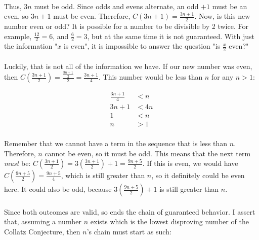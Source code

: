 \documentclass[12pt,letterpaper]{article}
\begin{document}
			\paragraph{} Thus, $3n$ must be odd. Since odds and evens alternate, an odd $+ 1$ must be an even, so $3n + 1$ must be even. Therefore, $C(3n + 1) = \frac{3n + 1}{2}$. Now, is this new number even or odd? It is possible for a number to be divisible by 2 twice. For example, $\frac{12}{2} = 6$, and $\frac{6}{2} = 3$, but at the same time it is not guaranteed. With just the information "$x$ is even", it is impossible to answer the question "is $\frac{x}{2}$ even?"
			
			\paragraph{} Luckily, that is not all of the information we have. If our new number was even, then $C(\frac{3n+1}{2}) = \frac{\frac{3n+1}{2}}{2} = \frac{3n+1}{4}$. This number would be less than $n$ for any $n > 1$:
			
			\begin{figure}[h]
				\begin{align*}
					\frac{3n+1}{4} &< n\\
					3n+1 &< 4n\\
					1 &< n\\
					n &> 1
				\end{align*}
			\end{figure}
		
			\paragraph{} Remember that we cannot have a term in the sequence that is less than $n$. Therefore, $n$ cannot be even, so it must be odd. This means that the next term \textit{must} be: $C(\frac{3n+1}{2}) = 3\left( \frac{3n + 1}{2} \right) + 1= \frac{9n+5}{2}$. If this is even, we would have $C(\frac{9n+5}{2}) = \frac{9n+5}{4}$, which is still greater than $n$, so it definitely could be even here. It could also be odd, because $3\left(\frac{9n+5}{2}\right) + 1$ is still greater than $n$.
			
			\paragraph{} Since both outcomes are valid, so ends the chain of guaranteed behavior. I assert that, assuming a number $n$ exists which is the lowest disproving number of the Collatz Conjecture, then $n$'s chain must start as such:
			
\end{document}
